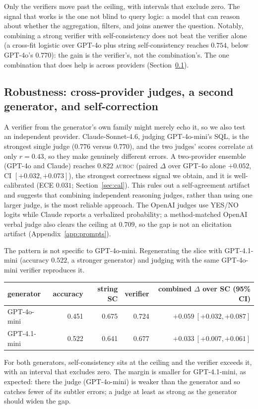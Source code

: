 \documentclass[11pt]{article}
\newcommand{\auroc}{\textsc{auroc}}
\begin{document}
Only the verifiers move past the ceiling, with intervals that exclude zero. The signal that works is
the one not blind to query logic: a model that can reason about whether the aggregation, filters, and
joins answer the question. Notably, combining a strong verifier with self-consistency does not beat
the verifier alone (a cross-fit logistic over GPT-4o plus string self-consistency reaches $0.754$,
below GPT-4o's $0.770$): the gain is the verifier's, not the combination's. The one combination that
does help is across providers (Section~\ref{sec:robust}).

\subsection{Robustness: cross-provider judges, a second generator, and self-correction}
\label{sec:robust}
A verifier from the generator's own family might merely echo it, so we also test an independent
provider. Claude-Sonnet-4.6, judging GPT-4o-mini's SQL, is the strongest single judge ($0.776$ versus
$0.770$), and the two judges' scores correlate at only $r=0.43$, so they make genuinely different
errors. A two-provider ensemble (GPT-4o and Claude) reaches $0.822$ \auroc{} (paired $\Delta$ over
GPT-4o alone $+0.052$, CI $[+0.032, +0.073]$), the strongest correctness signal we obtain, and it is
well-calibrated (ECE $0.031$; Section~\ref{sec:cal}). This rules out a self-agreement artifact and
suggests that combining independent reasoning judges, rather than using one larger judge, is the most
reliable approach. The OpenAI judges use YES/NO logits while Claude reports a verbalized probability;
a method-matched OpenAI verbal judge also clears the ceiling at $0.709$, so the gap is not an
elicitation artifact (Appendix~\ref{app:prompts}).

The pattern is not specific to GPT-4o-mini. Regenerating the slice with GPT-4.1-mini (accuracy
$0.522$, a stronger generator) and judging with the same GPT-4o-mini verifier reproduces it.
\begin{table}[h]\centering
\begin{tabular}{lrrrr}
\toprule
generator & accuracy & string SC & verifier & combined $\Delta$ over SC (95\% CI) \\
\midrule
GPT-4o-mini & 0.451 & 0.675 & 0.724 & $+0.059\ [+0.032, +0.087]$ \\
GPT-4.1-mini & 0.522 & 0.641 & 0.677 & $+0.033\ [+0.007, +0.061]$ \\
\bottomrule
\end{tabular}
\end{table}
For both generators, self-consistency sits at the ceiling and the verifier exceeds it, with an
interval that excludes zero. The margin is smaller for GPT-4.1-mini, as expected: there the judge
(GPT-4o-mini) is weaker than the generator and so catches fewer of its subtler errors; a judge at
least as strong as the generator should widen the gap.
\end{document}
